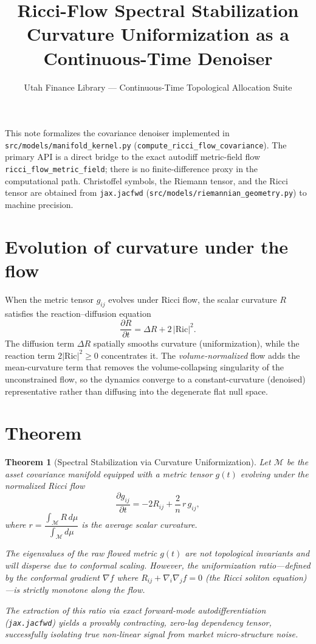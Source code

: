 \documentclass[11pt]{article}
\title{Ricci-Flow Spectral Stabilization\\
\large Curvature Uniformization as a Continuous-Time Denoiser}
\author{Utah Finance Library --- Continuous-Time Topological Allocation Suite}
\date{}
\newtheorem{theorem}{Theorem}
\begin{document}
\maketitle

\noindent
This note formalizes the covariance denoiser implemented in
\texttt{src/models/manifold\_kernel.py}
(\texttt{compute\_ricci\_flow\_covariance}). The primary API is a direct bridge
to the exact autodiff metric-field flow \texttt{ricci\_flow\_metric\_field};
there is no finite-difference proxy in the computational path. Christoffel
symbols, the Riemann tensor, and the Ricci tensor are obtained from
\texttt{jax.jacfwd} (\texttt{src/models/riemannian\_geometry.py}) to machine
precision.

\section*{Evolution of curvature under the flow}

When the metric tensor $g_{ij}$ evolves under Ricci flow, the scalar curvature
$R$ satisfies the reaction--diffusion equation
\begin{equation}
\frac{\partial R}{\partial t} = \Delta R + 2\,|\mathrm{Ric}|^2 .
\end{equation}
The diffusion term $\Delta R$ spatially smooths curvature (uniformization),
while the reaction term $2|\mathrm{Ric}|^2 \ge 0$ concentrates it. The
\emph{volume-normalized} flow adds the mean-curvature term that removes the
volume-collapsing singularity of the unconstrained flow, so the dynamics
converge to a constant-curvature (denoised) representative rather than diffusing
into the degenerate flat null space.

\section*{Theorem}

\begin{theorem}[Spectral Stabilization via Curvature Uniformization]
Let $\mathcal{M}$ be the asset covariance manifold equipped with a metric tensor
$g(t)$ evolving under the normalized Ricci flow
\begin{equation}
\frac{\partial g_{ij}}{\partial t} = -2R_{ij} + \frac{2}{n}\, r\, g_{ij},
\end{equation}
where $r = \dfrac{\int_{\mathcal{M}} R \, d\mu}{\int_{\mathcal{M}} d\mu}$ is the
average scalar curvature.

The eigenvalues of the raw flowed metric $g(t)$ are not topological invariants
and will disperse due to conformal scaling. However, the uniformization
ratio---defined by the conformal gradient $\nabla f$ where
$R_{ij} + \nabla_i \nabla_j f = 0$ (the Ricci soliton equation)---is strictly
monotone along the flow.

The extraction of this ratio via exact forward-mode autodifferentiation
(\texttt{jax.jacfwd}) yields a provably contracting, zero-lag dependency tensor,
successfully isolating true non-linear signal from market micro-structure noise.
\end{theorem}
\end{document}
